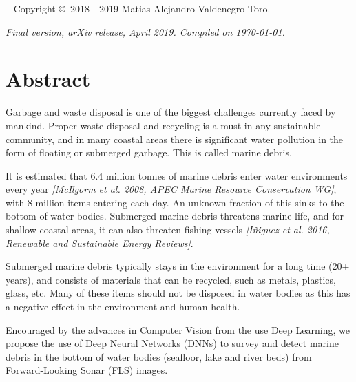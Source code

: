 \documentclass[a4paper, notoc, oneside, openany]{tufte-book} %
\begin{document}

\newpage
\begin{fullwidth}
~\vfill
\thispagestyle{empty}
\setlength{\parindent}{0pt}
\setlength{\parskip}{\baselineskip}
Copyright \copyright\ 2018 - 2019 Matias Alejandro Valdenegro Toro.

\par{}

\par\textit{Final version, arXiv release, April 2019. Compiled on \today.}
\end{fullwidth}

\justifying
\cleardoublepage
\chapter{Abstract}
\thispagestyle{empty}
Garbage and waste disposal is one of the biggest challenges currently faced by mankind. Proper waste disposal and recycling is a must in any sustainable community, and in many coastal areas there is significant water pollution in the form of floating or submerged garbage. This is called marine debris.

It is estimated that 6.4 million tonnes of marine debris enter water environments every year \textit{[McIlgorm et al. 2008, APEC Marine Resource Conservation WG]}, with 8 million items entering each day. An unknown fraction of this sinks to the bottom of water bodies. Submerged marine debris threatens marine life, and for shallow coastal areas, it can also threaten fishing vessels \textit{[I{\~n}iguez et al. 2016, Renewable and Sustainable Energy Reviews]}.

Submerged marine debris typically stays in the environment for a long time (20+ years), and consists of materials that can be recycled, such as metals, plastics, glass, etc. Many of these items should not be disposed in water bodies as this has a negative effect in the environment and human health. 

Encouraged by the advances in Computer Vision from the use Deep Learning, we propose the use of Deep Neural Networks (DNNs) to survey and detect marine debris in the bottom of water bodies (seafloor, lake and river beds) from Forward-Looking Sonar (FLS) images.
\end{document}
